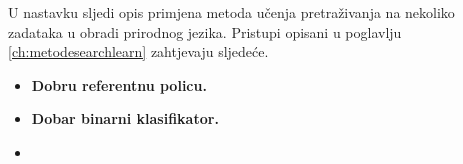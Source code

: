U nastavku sljedi opis primjena metoda učenja pretraživanja na nekoliko zadataka
u obradi prirodnog jezika. Pristupi opisani u poglavlju
\ref{ch:metodesearchlearn} zahtjevaju sljedeće.

\begin{itemize}
\item \textbf{Dobru referentnu policu.}
\item \textbf{Dobar binarni klasifikator.}
\item \textbf{}
\end{itemize}
